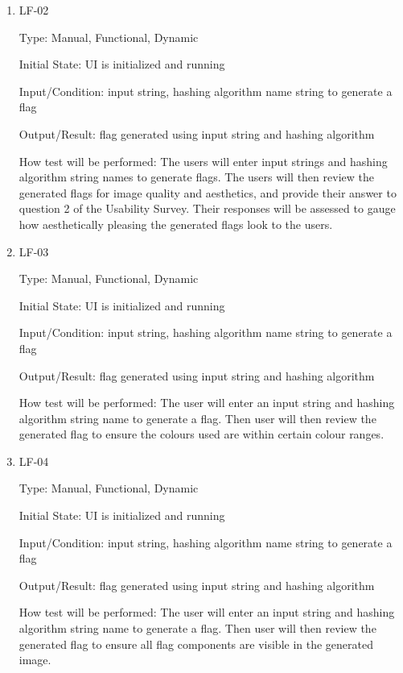 \documentclass[12pt, titlepage]{article}
\begin{document}
\begin{enumerate}

\item{LF-02\\}

Type: Manual, Functional, Dynamic

Initial State: UI is initialized and running

Input/Condition: input string, hashing algorithm name string to generate a
flag

Output/Result: flag generated using input string and hashing algorithm

How test will be performed: The users will enter input strings and hashing
algorithm string names to generate flags. The users will then review the
generated flags for image quality and aesthetics, and provide their answer
to question 2 of the Usability Survey. Their responses will be assessed to
gauge how aesthetically pleasing the generated flags look to the users.

\item{LF-03\\}

Type: Manual, Functional, Dynamic

Initial State: UI is initialized and running

Input/Condition: input string, hashing algorithm name string to generate a
flag

Output/Result: flag generated using input string and hashing algorithm

How test will be performed: The user will enter an input string and hashing
algorithm string name to generate a flag. Then user will then review the
generated flag to ensure the colours used are within certain colour ranges.

\item{LF-04\\}

Type: Manual, Functional, Dynamic

Initial State: UI is initialized and running

Input/Condition: input string, hashing algorithm name string to generate a
flag

Output/Result: flag generated using input string and hashing algorithm

How test will be performed: The user will enter an input string and hashing
algorithm string name to generate a flag. Then user will then review the
generated flag to ensure all flag components are visible in the generated
image.

\end{enumerate}
\end{document}
